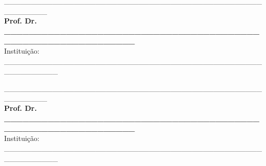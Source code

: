 \documentclass[
	12pt,				%
	oneside,			%
	a4paper,			%
	english,			%
	brazil				%
	]{abntex2ppgsi}
\begin{document}
\begin{folhadeaprovacao}
\begin{center}
\vspace*{2cm}

\_\_\_\_\_\_\_\_\_\_\_\_\_\_\_\_\_\_\_\_\_\_\_\_\_\_\_\_\_\_\_\_\_\_\_\_\_\_\_\_\_\_\_\_\_\_\_\_\_\_\_\_\_\_\_\_
\vspace*{0.2cm} 
\\ \textbf{Prof. Dr. \_\_\_\_\_\_\_\_\_\_\_\_\_\_\_\_\_\_\_\_\_\_\_\_\_\_\_\_\_\_\_\_\_\_\_\_\_\_\_\_\_\_\_\_\_\_\_\_\_\_\_\_\_\_\_\_\_\_\_\_\_\_} 
\\ \vspace*{0.2cm} 
Instituição: \_\_\_\_\_\_\_\_\_\_\_\_\_\_\_\_\_\_\_\_\_\_\_\_\_\_\_\_\_\_\_\_\_\_\_\_\_\_\_\_\_\_\_\_\_\_\_\_\_\_\_\_\_\_\_\_\_\_

\vspace*{2cm}

\_\_\_\_\_\_\_\_\_\_\_\_\_\_\_\_\_\_\_\_\_\_\_\_\_\_\_\_\_\_\_\_\_\_\_\_\_\_\_\_\_\_\_\_\_\_\_\_\_\_\_\_\_\_\_\_
\vspace*{0.2cm} 
\\ \textbf{Prof. Dr. \_\_\_\_\_\_\_\_\_\_\_\_\_\_\_\_\_\_\_\_\_\_\_\_\_\_\_\_\_\_\_\_\_\_\_\_\_\_\_\_\_\_\_\_\_\_\_\_\_\_\_\_\_\_\_\_\_\_\_\_\_\_} 
\\ \vspace*{0.2cm} 
Instituição: \_\_\_\_\_\_\_\_\_\_\_\_\_\_\_\_\_\_\_\_\_\_\_\_\_\_\_\_\_\_\_\_\_\_\_\_\_\_\_\_\_\_\_\_\_\_\_\_\_\_\_\_\_\_\_\_\_\_

\end{center}

\end{folhadeaprovacao}

%
% 

\end{document}
